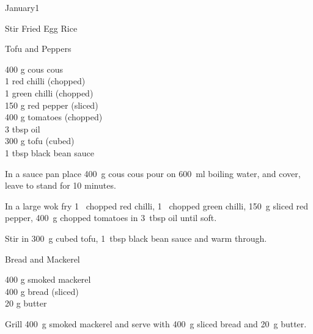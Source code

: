 \begin{menu}{January1}
\begin{recipe}{2}{Stir Fried Egg Rice}
\begin{instructions}
    \end{instructions}
    \end{recipe}%
  
    \begin{recipe}{2}{Tofu and Peppers}%
		\begin{ingredients}
		400 g cous cous  \\
	1  red chilli (chopped) \\
	1  green chilli (chopped) \\
	150 g red pepper (sliced) \\
	400 g tomatoes (chopped) \\
	3 tbsp oil  \\
	300 g tofu (cubed) \\
	1 tbsp black bean sauce  \\
	
		\end{ingredients}
	
	
    \begin{instructions}
    \item 
    In a
    sauce pan 
    place
    400~g  cous cous
    pour on
    600~ml  boiling water,
    and cover, leave to stand for 10 minutes.
  \item 
        In a large wok fry
        1~ chopped red chilli,
        1~ chopped green chilli,
        150~g sliced red pepper,
        400~g chopped tomatoes
        in
        3~tbsp  oil
        until soft.
      \item 
        Stir in
        300~g cubed tofu,
        1~tbsp  black bean sauce
        and warm through.
      
    \end{instructions}
    \end{recipe}%
  
    \begin{recipe}{1}{Bread and Mackerel}%
		\begin{ingredients}
		400 g smoked mackerel  \\
	400 g bread (sliced) \\
	20 g butter  \\
	
		\end{ingredients}
	
	
    \begin{instructions}
    \item 
        Grill
        400~g  smoked mackerel
        and serve with
        400~g sliced bread
        and
        20~g  butter.
      
    \end{instructions}
    \end{recipe}%
  
    \clearpage
    \end{menu}
	
